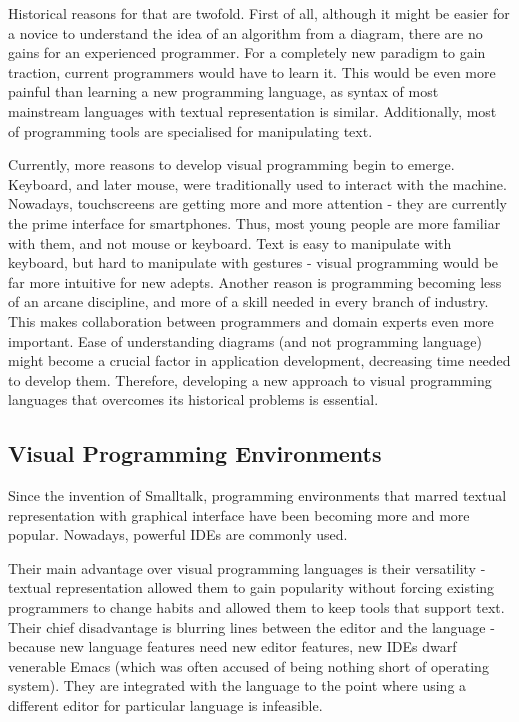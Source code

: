 \documentclass[11pt]{scrartcl}
\begin{document}
Historical reasons for that are twofold.
First of all, although it might be easier for a novice to understand the idea of
an algorithm from a diagram, there are no gains for an experienced programmer.
For a completely new paradigm to gain traction, current programmers would have
to learn it.
This would be even more painful than learning a new programming language, as
syntax of most mainstream languages with textual representation is similar.
Additionally, most of programming tools are specialised for manipulating text.


Currently, more reasons to develop visual programming begin to emerge.
Keyboard, and later mouse, were traditionally used to interact with the machine.
Nowadays, touchscreens are getting more and more attention - they are currently
the prime interface for smartphones.
Thus, most young people are more familiar with them, and not mouse or keyboard.
Text is easy to manipulate with keyboard, but hard to manipulate with gestures -
visual programming would be far more intuitive for new adepts.
Another reason is programming becoming less of an arcane discipline, and more of
a skill needed in every branch of industry.
This makes collaboration between programmers and domain experts even more
important.
Ease of understanding diagrams (and not programming language) might become a
crucial factor in application development, decreasing time needed to develop
them.
Therefore, developing a new approach to visual programming languages that
overcomes its historical problems is essential.


\subsection{Visual Programming Environments}
Since the invention of Smalltalk, programming environments that marred textual
representation with graphical interface have been becoming more and more
popular.
Nowadays, powerful IDEs are commonly used.

Their main advantage over visual programming languages is their versatility -
textual representation allowed them to gain popularity without forcing existing
programmers to change habits and allowed them to keep tools that support text.
Their chief disadvantage is blurring lines between the editor and the language -
because new language features need new editor features, new IDEs dwarf venerable
Emacs (which was often accused of being nothing short of operating system).
They are integrated with the language to the point where using a different
editor for particular language is infeasible.
\end{document}
